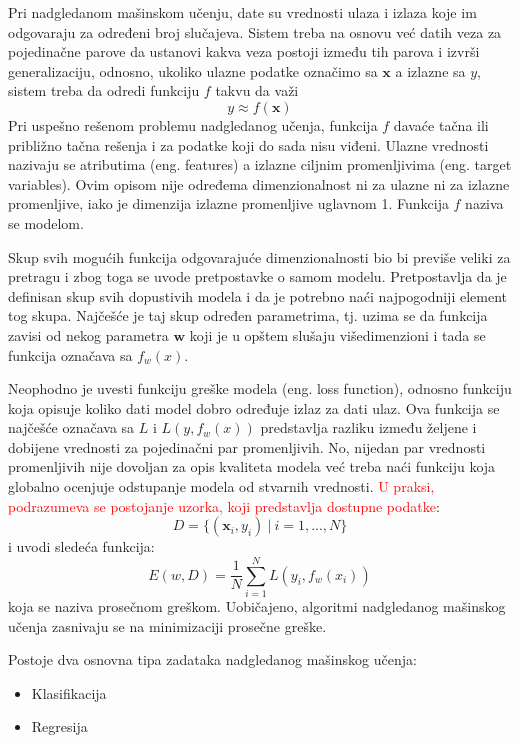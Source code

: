 Pri nadgledanom mašinskom učenju, date su vrednosti ulaza i izlaza koje im odgovaraju za određeni broj slučajeva. Sistem treba na osnovu već datih veza za pojedinačne parove da ustanovi kakva veza postoji između tih parova i izvrši generalizaciju, odnosno, ukoliko ulazne podatke označimo sa $\bm{x}$ a izlazne sa $y$, sistem treba da odredi funkciju $f$ takvu da važi
\begin{equation}
	y \approx f(\bm{x})
\end{equation}
Pri uspešno rešenom problemu nadgledanog učenja, funkcija $f$ davaće tačna ili približno tačna rešenja i za podatke koji do sada nisu viđeni.
Ulazne vrednosti nazivaju se atributima (eng. features) a izlazne ciljnim promenljivima (eng. target variables). Ovim opisom nije određema dimenzionalnost ni za ulazne ni za izlazne promenljive, iako je dimenzija izlazne promenljive uglavnom 1. Funkcija $f$ naziva se modelom. \par
Skup svih mogućih funkcija odgovarajuće dimenzionalnosti bio bi previše veliki za pretragu i zbog toga se uvode pretpostavke o samom modelu. Pretpostavlja da je definisan skup svih dopustivih modela i da je potrebno naći najpogodniji element tog skupa. Najčešće je taj skup određen parametrima, tj. uzima se da funkcija zavisi od nekog parametra $\bm{w}$ koji je u opštem slušaju višedimenzioni i tada se funkcija označava sa $f_w(x)$.

\par
Neophodno je uvesti funkciju greške modela (eng. loss function), odnosno funkciju koja opisuje koliko dati model dobro određuje izlaz za dati ulaz. Ova funkcija se najčešće označava sa $L$ i $L(y, f_w(x))$ predstavlja razliku između željene i dobijene vrednosti za pojedinačni par promenljivih. No, nijedan par vrednosti promenljivih nije dovoljan za opis kvaliteta modela već treba naći funkciju koja globalno ocenjuje odstupanje modela od stvarnih vrednosti. \textcolor{red}{U praksi, podrazumeva se postojanje uzorka, koji predstavlja dostupne podatke}:
\begin{equation}
		D=\{(\bm{x}_i, y_i)~|~i=1,...,N\}
\end{equation}
i uvodi sledeća funkcija:
\begin{equation}
	E(w, D) = \frac{1}{N}\sum_{i=1}^{N}L(y_i, f_w(x_i))
\end{equation}
koja se naziva prosečnom greškom. Uobičajeno, algoritmi nadgledanog mašinskog učenja zasnivaju se na minimizaciji prosečne greške. \par 
Postoje dva osnovna tipa zadataka nadgledanog mašinskog učenja:
\begin{itemize}
	\item Klasifikacija 
	\item Regresija
\end{itemize}

